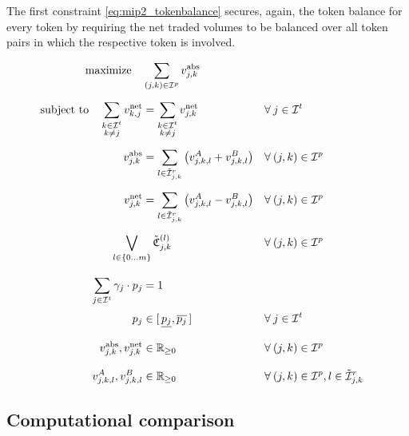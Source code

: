 \documentclass[11pt,parskip=full]{scrartcl}%
\newcommand*{\itokens}{\mathcal{I}^t}       %
\newcommand*{\itokenpairs}{\mathcal{I}^p}   %
\begin{document}
The first constraint \eqref{eq:mip2_tokenbalance} secures, again, the token balance for every token
by requiring the net traded volumes to be balanced over all token pairs in which the respective
token is involved.

\newpage
\begin{subequations}
\begin{align}
  \text{maximize} \quad & \sum\limits_{(j,k) \in \itokenpairs} v_{j,k}^\mathrm{abs}
  \label{eq:mip2_objective}
  \\[2mm]
  \text{subject to} \quad
  \sum_{\substack{k \in \itokens \\ k \neq j}} v_{k,j}^\mathrm{net}
  &= \sum_{\substack{k \in \itokens \\ k \neq j}} v_{j,k}^\mathrm{net}
  && \forall \> j \in \itokens
  \label{eq:mip2_tokenbalance}
  \\[2mm]
  v_{j,k}^\mathrm{abs}
  &= \sum\limits_{l \in \tilde{\mathcal{I}}_{j,k}^r} \left( v^A_{j,k,l} + v^B_{j,k,l} \right)
  && \forall \> (j,k) \in \itokenpairs
  \label{eq:mip2_volume_aggr_abs}
  \\[2mm]
  v_{j,k}^\mathrm{net}
  &= \sum\limits_{l \in \tilde{\mathcal{I}}_{j,k}^r} \left( v^A_{j,k,l} - v^B_{j,k,l} \right)
  && \forall \> (j,k) \in \itokenpairs
  \label{eq:mip2_volume_aggr_net}
  \\[2mm]
  &\hspace{-1cm}\bigvee\limits_{l \in \{0 \ldots m\}} \tilde{\mathfrak{C}}^{(l)}_{j,k}
  && \forall \> (j,k) \in \itokenpairs
  \\[3mm]
  \sum\limits_{j \in \itokens} \gamma_j \cdot p_j
  &= 1
  \label{eq:mip1_reftoken}
  \\[1mm]
  p_j
  &\in [\,\underline{p_j},\overline{p_j}\,]
  && \forall \> j \in \itokens
  \\[3mm]
  v_{j,k}^\mathrm{abs}, v_{j,k}^\mathrm{net}
  &\in \mathbb{R}_{\ge 0}
  && \forall \> (j,k) \in \itokenpairs
  \\[3mm]
  v^A_{j,k,l}, v^B_{j,k,l}
  &\in \mathbb{R}_{\ge 0}
  && \forall \> (j,k) \in \itokenpairs, l \in \tilde{\mathcal{I}}_{j,k}^r
\end{align}
\label{eq:mip2}
\end{subequations}


\newpage
\subsection{Computational comparison}
\label{subsec:computational_comparison}
\end{document}
